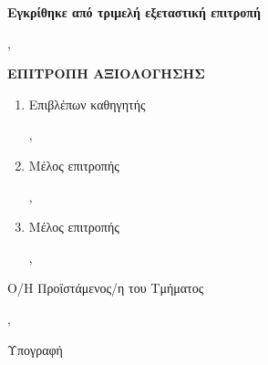 \thispagestyle{empty}

{\bfseries Εγκρίθηκε από τριμελή εξεταστική επιτροπή}

\thesisplace, \thesismonth{} \thesisyear

\vspace{1.5cm}

{\bfseries ΕΠΙΤΡΟΠΗ ΑΞΙΟΛΟΓΗΣΗΣ}

\vspace{1cm}

\begin{enumerate}
  \item Επιβλέπων καθηγητής

        \thesissupervisor\ifthesisshowranks,

        \thesissupervisorrank\fi

  \vspace{0.5cm}

  \item Μέλος επιτροπής

        \thesiscommitteesecond\ifthesisshowranks,

        \thesiscommitteesecondrank\fi

  \vspace{0.5cm}

  \item Μέλος επιτροπής

        \thesiscommitteethird\ifthesisshowranks,

        \thesiscommitteethirdrank\fi
\end{enumerate}

\vspace{2.5cm}

Ο/Η Προϊστάμενος/η του Τμήματος

\thesisheadofdepartment\ifthesisshowranks,

\thesisheadofdepartmentrank\fi

\vspace{0.8cm}

Υπογραφή

\clearpage
